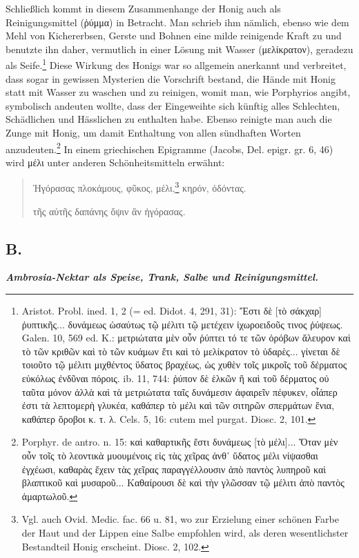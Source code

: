 \documentclass[a4paper, 11pt, oneside]{article}
\begin{document}
Schließlich kommt in diesem Zusammenhange der Honig auch als Reinigungsmittel (ῥύμμα) in Betracht. Man schrieb ihm nämlich, ebenso wie dem Mehl von Kichererbsen, Gerste und Bohnen eine milde reinigende Kraft zu und benutzte ihn daher, vermutlich in einer Lösung mit Wasser (μελίκρατον), geradezu als Seife.\footnote{Aristot. Probl. ined. 1, 2 (= ed. Didot. 4, 291, 31): Ἔστι δὲ [τὸ σάκχαρ] ῤυπτικῆς... δυνάμεως ὡσαύτως τῷ μέλιτι τῷ μετέχειν ἰχωροειδοῦς τινος ῤύψεως. Galen. 10, 569 ed. K.: μετριώτατα μὲν οὖν ῥύπτει τό τε τῶν ὀρόβων ἄλευρον καὶ τὸ τῶν κριθῶν καὶ τὸ τῶν κυάμων ἔτι καὶ τὸ μελίκρατον τὸ ὑδαρὲς... γίνεται δὲ τοιοῦτο τῷ μέλιτι μιχθέντος ὕδατος βραχέως, ὡς χυθὲν τοῖς μικροῖς τοῦ δἐρματος εὐκόλως ἐνδῦναι πόροις. ib. 11, 744: ῥύπον δὲ ἑλκῶν ἢ καὶ τοῦ δέρματος οὐ ταῦτα μόνον ἀλλὰ καὶ τὰ μετριώτατα ταῖς δυνάμεσιν ἀφαιρεῖν πέφυκεν, οἶάπερ ἐστι τὰ λεπτομερὴ γλυκέα, καθάπερ τὸ μέλι καὶ τῶν σιτηρῶν σπερμάτων ἕνια, καθάπερ ὅροβοι κ. τ. λ. Cels. 5, 16: cutem mel purgat. Diosc. 2, 101.} Diese Wirkung des Honigs war so allgemein anerkannt und verbreitet, dass sogar in gewissen Mysterien die Vorschrift bestand, die Hände mit Honig statt mit Wasser zu waschen und zu reinigen, womit man, wie Porphyrios angibt, symbolisch andeuten wollte, dass der Eingeweihte sich künftig alles Schlechten, Schädlichen und Hässlichen zu enthalten habe. Ebenso reinigte man auch die Zunge mit Honig, um damit Enthaltung von allen sündhaften Worten anzudeuten.\footnote{Porphyr. de antro. n. 15: καὶ καθαρτικῆς ἔστι δυνάμεως [τὸ μέλι]... Ὅταν μὲν οὖν τοῖς τὸ λεοντικὰ μυουμένοις εἰς τὰς χεῖρας ἀνθ᾽ ὕδατος μέλι νίψασθαι ἐγχέωσι, καθαρὰς ἔχειν τὰς χεῖρας παραγγέλλουσιν ἀπὸ παντὸς λυπηροῦ καὶ βλαπτικοῦ καὶ μυσαροῦ... Καθαίρουσι δὲ καὶ τὴν γλῶσσαν τῷ μέλιτι ἀπὸ παντὸς ἁμαρτωλοῦ.} In einem griechischen Epigramme (Jacobs, Del. epigr. gr. 6, 46) wird μέλι unter anderen Schönheitsmitteln erwähnt:
\begin{quotation}\large
Ἠγόρασας πλοκάμους, φῦκος, μέλι,\footnote{Vgl. auch Ovid. Medic. fac. 66 u. 81, wo zur Erzielung einer schönen Farbe der Haut und der Lippen eine Salbe empfohlen wird, als deren wesentlichster Bestandteil Honig erscheint. Diosc. 2, 102.} κηρόν, ὀδόντας.

τῆς αὐτῆς δαπάνης ὄψιν ἂν ἠγόρασας.
\end{quotation}
\paragraph{}
\subsection{B.}
\begin{center}
\textbf{\emph{Ambrosia-Nektar als Speise, Trank, Salbe und Reinigungsmittel.}}
\end{center}
\end{document}
